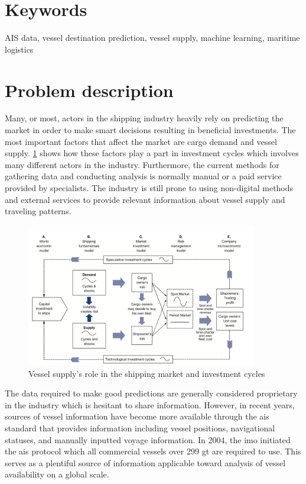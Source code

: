 \section{Keywords}

AIS data, vessel destination prediction, vessel supply, machine learning, maritime logistics

\section{Problem description}
\label{sec:problem_desc}

Many, or most, actors in the shipping industry heavily rely on predicting the market in order to make smart decisions resulting in beneficial investments. The most important factors that affect the market are cargo demand and vessel supply. \cref{fig:maritime_economics} shows how these factors play a part in investment cycles which involves many different actors in the industry. Furthermore, the current methods for gathering data and conducting analysis is normally manual or a paid service provided by specialists. The industry is still prone to using non-digital methods and external services to provide relevant information about vessel supply and traveling patterns.

\begin{figure}[htbp]
    \centering
    \includegraphics[width=0.9\textwidth]{figures/investment_cycle}
    \caption{Vessel supply’s role in the shipping market and investment cycles \parencite{stopford2008}}
    \label{fig:maritime_economics}
\end{figure}

The data required to make good predictions are generally considered proprietary in the industry which is hesitant to share information. However, in recent years, sources of vessel information have become more available through the \acrshort{ais} standard that provides information including vessel positions, navigational statuses, and manually inputted voyage information. In 2004, the \acrfull{imo} initiated the \acrshort{ais} protocol which all commercial vessels over 299 \acrfull{gt} are required to use. This serves as a plentiful source of information applicable toward analysis of vessel availability on a global scale.

